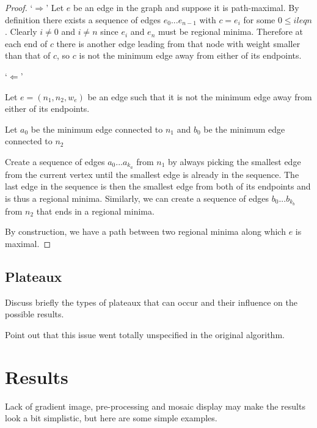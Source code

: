 \documentclass{jfp}
\begin{document}
\begin{proof}

\noindent `$\Rightarrow$'
\indent
  Let $e$ be an edge in the graph and suppose it is path-maximal.
  By definition there exists a sequence of edges $e_0 ... e_{n-1}$
  with $c = e_i$ for some $ 0 \leq i leq n$. Clearly $i \neq 0$ and $i \neq n$ since
  $e_i$ and $e_n$ must be regional minima. Therefore at each end of $c$ there is another edge
  leading from that node with weight smaller than that of $c$, so $c$ is
  not the minimum edge away from either of its endpoints.

\vspace{13pt}

\noindent
`$\Leftarrow$'
\indent

  Let $e = (n_1,n_2,w_e)$ be an edge such that it is not the minimum
  edge away from either of its endpoints.

  Let $a_0$ be the minimum edge connected to $n_1$ and $b_0$ be the
  minimum edge connected to $n_2$

  Create a sequence of edges $a_0 ... a_{k_a}$  from $n_1$ by always picking the smallest
  edge from the current vertex until the smallest edge is already in
  the sequence. The last edge in the sequence is then the smallest
  edge from both of its endpoints and is thus a regional minima.
  Similarly, we can create a sequence of edges $b_0 ... b_{k_b}$ from
  $n_2$ that ends in a regional minima.

  By construction, we have a path between two regional minima along which
  $e$ is maximal.


\end{proof}


\subsection{Plateaux}

Discuss briefly the types of plateaux that can occur and their
influence on the possible results.

Point out that this issue went totally unspecified in the original
algorithm.


\section{Results}

Lack of gradient image, pre-processing and mosaic display may make the
results look a bit simplistic, but here are some simple examples.
\end{document}
